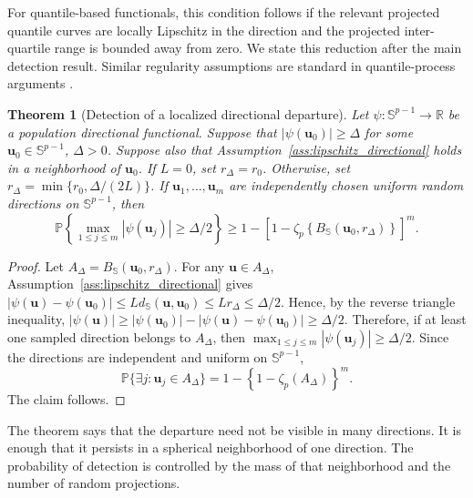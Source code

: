 \documentclass[11pt]{article}
\theoremstyle{plain}
\newtheorem{theorem}{Theorem}
\theoremstyle{definition}
\theoremstyle{remark}
\def\u{\bm{u}}
\newcommand{\Prob}{\mathbb{P}}
\newcommand{\abs}[1]{\left\lvert #1 \right\rvert}
\begin{document}
For quantile-based functionals, this condition follows if the relevant projected quantile curves are locally Lipschitz in the direction and the projected inter-quartile range is bounded away from zero. We state this reduction after the main detection result. Similar regularity assumptions are standard in quantile-process arguments \citep[see, for example,][Chapter~21]{vandervaart1998asymptotic}.

\begin{theorem}[Detection of a localized directional departure]
	\label{thm:random_direction_detection}
	Let \(\psi:\mathbb{S}^{p-1}\to\mathbb R\) be a population directional functional. Suppose that \(\abs{\psi(\u_0)} \geqslant \Delta\) for some \(\u_0\in \mathbb{S}^{p-1}\), \(\Delta>0\). Suppose also that Assumption~\ref{ass:lipschitz_directional} holds in a neighborhood of \(\u_0\). If \(L=0\), set \(r_\Delta=r_0\). Otherwise, set \(r_\Delta=\min\{r_0,\Delta/(2L)\}\). If \(\u_1,\ldots,\u_m\) are independently chosen uniform random directions on \(\mathbb{S}^{p-1}\), then
    \[
	\Prob\left\{\max_{1\leqslant j\leqslant m} \abs{\psi(\u_j)} \geqslant \Delta/2\right\}
	\geqslant
	1-\left[1-\zeta_p \left\{B_{\mathbb S}(\u_0,r_\Delta)\right\}\right]^m .
	\]
\end{theorem}

\begin{proof}
	Let \(A_\Delta=B_{\mathbb S}(\u_0,r_\Delta)\). For any \(\u\in A_\Delta\), Assumption~\ref{ass:lipschitz_directional} gives \(\abs{\psi(\u)-\psi(\u_0)} \leqslant Ld_{\mathbb S}(\u,\u_0) \leqslant Lr_\Delta \leqslant \Delta/2\). Hence, by the reverse triangle inequality, \(\abs{\psi(\u)} \geqslant \abs{\psi(\u_0)} - \abs{\psi(\u)-\psi(\u_0)} \geqslant \Delta/2\). Therefore, if at least one sampled direction belongs to \(A_\Delta\), then \(\max_{1\leqslant j\leqslant m}|\psi(\u_j)|\geqslant \Delta/2\). Since the directions are independent and uniform on \(\mathbb{S}^{p-1}\),
	\[
	\Prob\{\exists j:\u_j\in A_\Delta\}
	=
	1-\left\{1-\zeta_p (A_\Delta)\right\}^m.
	\]
	The claim follows.
\end{proof}

The theorem says that the departure need not be visible in many directions. It is enough that it persists in a spherical neighborhood of one direction. The probability of detection is controlled by the mass of that neighborhood and the number of random projections.
\end{document}
